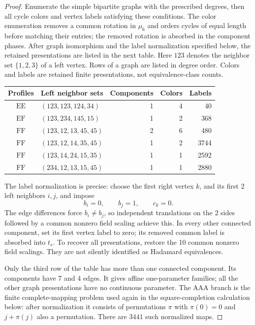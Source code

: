 \documentclass[11pt,a4paper]{article}
\theoremstyle{plain}
\theoremstyle{definition}
\theoremstyle{plain}
\begin{document}
\begin{proof}
\medskip
Enumerate the simple bipartite graphs with the prescribed degrees, then all cycle colors and vertex labels satisfying these conditions. The color enumeration removes a common rotation in $\mu_6$ and orders cycles of equal length before matching their entries; the removed rotation is absorbed in the component phases. After graph isomorphism and the label normalization specified below, the retained presentations are listed in the next table. Here $123$ denotes the neighbor set $\{1,2,3\}$ of a left vertex. Rows of a graph are listed in degree order. Colors and labels are retained finite presentations, not equivalence-class counts.
\begin{center}
\small
\begin{tabular}{@{}clrrr@{}}
\toprule
Profiles & Left neighbor sets & Components & Colors & Labels\\
\midrule
$\mathrm{EE}$ & $(123,123,124,34)$ & 1 & 4 & 40\\
$\mathrm{EF}$ & $(123,234,145,15)$ & 1 & 2 & 368\\
$\mathrm{FF}$ & $(123,12,13,45,45)$ & 2 & 6 & 480\\
$\mathrm{FF}$ & $(123,12,14,35,45)$ & 1 & 2 & 3744\\
$\mathrm{FF}$ & $(123,14,24,15,35)$ & 1 & 1 & 2592\\
$\mathrm{FF}$ & $(234,12,13,15,45)$ & 1 & 1 & 2880\\
\bottomrule
\end{tabular}
\end{center}
The label normalization is precise: choose the first right vertex $k$, and its first 2 left neighbors $i,j$, and impose
$$b_i=0,\qquad b_j=1,\qquad c_k=0.$$
The edge differences force $b_i\ne b_j$, so independent translations on the 2 sides followed by a common nonzero field scaling achieve this. In every other connected component, set its first vertex label to zero; its removed common label is absorbed into $t_s$. To recover all presentations, restore the 10 common nonzero field scalings. They are not silently identified as Hadamard equivalences.

Only the third row of the table has more than one connected component. Its components have 7 and 4 edges. It gives affine one-parameter families; all the other graph presentations have no continuous parameter. The $\mathrm{AAA}$ branch is the finite complete-mapping problem used again in the square-completion calculation below: after normalization it consists of permutations $\pi$ with $\pi(0)=0$ and $j+\pi(j)$ also a permutation. There are $3441$ such normalized maps.
\end{proof}
\end{document}
